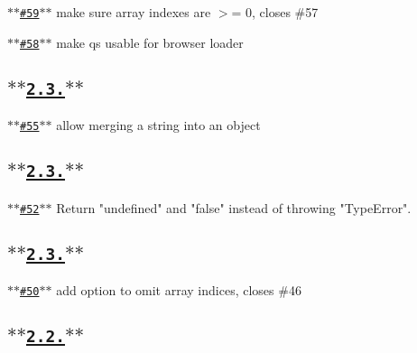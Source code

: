 
\begin{DoxyItemize}
\item \href{https://github.com/hapijs/qs/issues/59}{\tt $\ast$$\ast$\#59$\ast$$\ast$} make sure array indexes are $>$= 0, closes \#57
\item \href{https://github.com/hapijs/qs/issues/58}{\tt $\ast$$\ast$\#58$\ast$$\ast$} make qs usable for browser loader
\end{DoxyItemize}

\subsection*{\href{https://github.com/hapijs/qs/issues?milestone=17&state=closed}{\tt $\ast$$\ast$2.3.$\ast$$\ast$}}


\begin{DoxyItemize}
\item \href{https://github.com/hapijs/qs/issues/55}{\tt $\ast$$\ast$\#55$\ast$$\ast$} allow merging a string into an object
\end{DoxyItemize}

\subsection*{\href{https://github.com/hapijs/qs/issues?milestone=16&state=closed}{\tt $\ast$$\ast$2.3.$\ast$$\ast$}}


\begin{DoxyItemize}
\item \href{https://github.com/hapijs/qs/issues/52}{\tt $\ast$$\ast$\#52$\ast$$\ast$} Return "undefined" and "false" instead of throwing "Type\+Error".
\end{DoxyItemize}

\subsection*{\href{https://github.com/hapijs/qs/issues?milestone=15&state=closed}{\tt $\ast$$\ast$2.3.$\ast$$\ast$}}


\begin{DoxyItemize}
\item \href{https://github.com/hapijs/qs/issues/50}{\tt $\ast$$\ast$\#50$\ast$$\ast$} add option to omit array indices, closes \#46
\end{DoxyItemize}

\subsection*{\href{https://github.com/hapijs/qs/issues?milestone=14&state=closed}{\tt $\ast$$\ast$2.2.$\ast$$\ast$}}


